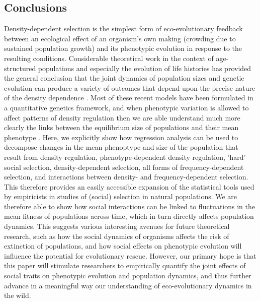 \documentclass{article}
\begin{document}
\subsection{Conclusions}
Density-dependent selection is the simplest form of eco-evolutionary feedback between an ecological effect of an organism’s own making (crowding due to sustained population growth) and its phenotypic evolution in response to the resulting conditions. Considerable theoretical work in the context of age-structured populations and especially the evolution of life histories has provided the general conclusion that the joint dynamics of population sizes and genetic evolution can produce a variety of outcomes that depend upon the precise nature of the density dependence \citep{Engen2013, Engen2020, Lande2009a, Lande2017}. Most of these recent models have been formulated in a quantitative genetics framework, and when phenotypic variation is allowed to affect patterns of density regulation then we are able understand much more clearly the links between the equilibrium size of populations and their mean phenotype \citep{Engen2020}. Here, we explicitly show how regression analysis can be used to decompose changes in the mean phenoptype and size of the population that result from density regulation, phenotype-dependent density regulation, 'hard' social selection, density-dependent selection, all forms of frequency-dependent selection, and interactions between density- and frequency-dependent selection. This therefore provides an easily accessible expansion of the statistical tools used by empiricists in studies of (social) selection in natural populations. We are therefore able to show how social interactions can be linked to fluctuations in the mean fitness of populations across time, which in turn directly affects population dynamics. This suggests various interesting avenues for future theoretical research, such as how the social dynamics of organisms affects the risk of extinction of populations, and how social effects on phenotypic evolution will influence the potential for evolutionary rescue. However, our primary hope is that this paper will stimulate researchers to empirically quantify the joint effects of social traits on phenotypic evolution and population dynamics, and thus further advance in a meaningful way our understanding of eco-evolutionary dynamics in the wild.



  
\end{document}
